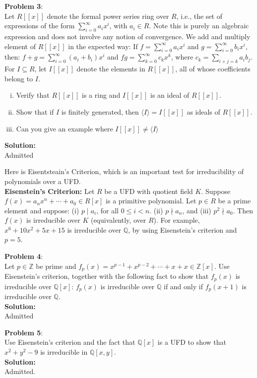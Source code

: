 \documentclass[11pt]{article}
\newcommand{\prob}[3]{\begin{flushleft}
        \textbf{Problem #1}: \\
        #2 
		\textbf{Solution:} 
		#3

\end{flushleft}}
\begin{document}
\prob{3}{
  Let $R[[x]]$ denote the formal power series ring over $R$, i.e., the set of expressions of the form $\sum_{i = 0}^{\infty}a_ix^i$, with $a_i \in R$.
  Note this is purely an algebraic expression and does not involve any notion of convergence.
  We add and multiply element of $R[[x]]$ in the expected way:
  If $f = \sum_{i=0}^{\infty}a_ix^i$ and $g = \sum_{i=0}^{\infty}b_ix^i$, then:
  $f + g = \sum_{i=0}^{\infty}(a_i + b_i)x^i$ and $fg = \sum_{k=0}^{\infty}c_kx^k$, where $c_k = \sum_{i + j = k}a_ib_j$. For $I \subseteq R$, let $I[[x]]$ denote the elements in $R[[x]]$, all of whose coefficients belong to $I$.
  \begin{enumerate}[(i)]
    \item Verify that $R[[x]]$ is a ring and $I[[x]]$ is an ideal of $R[[x]]$.
    \item Show that if $I$ is finitely generated, then $\langle I \rangle = I[[x]]$ as ideals of $R[[x]]$.
    \item Can you give an example where $I[[x]] \neq \langle I \rangle$
  \end{enumerate}
}{ \\
  Admitted
}
Here is Eisentsteain's Criterion, which is an important test for irreducibility of polynomials over a UFD. \\
\textbf{Eisenstein's Criterion:} Let $R$ be a UFD with quotient field $K$.
Suppose $f(x) = a_nx^n + \cdots + a_0 \in R[x]$ is a primitive polynomial.
Let $p \in R$ be a prime element and suppose: (i) $p \mid a_i$, for all $0 \leq i < n$.
(ii) $p \nmid a_n$, and (iii) $p^2 \nmid a_0$.
Then $f(x)$ is irreducible over $K$ (equivalently, over $R$).
For example, $x^6 + 10x^2 + 5x + 15$ is irreducible over $\mathbb{Q}$, by using Eisenstein's criterion and $p = 5$.

\prob{4}{
  Let $p \in \mathbb{Z}$ be prime and $f_p(x) = x^{p-1} + x^{p-2} + \cdots + x + x \in \mathbb{Z}[x]$. Use Eisenstein's criterion, together with the following fact to show that $f_p(x)$ is irreducible over $\mathbb{Q}[x]$: $f_p(x)$ is irreducible over $\mathbb{Q}$ if and only if $f_p(x + 1)$ is irreducible over $\mathbb{Q}$. \\
}{ \\
  Admitted
}

\prob{5}{
  Use Eisenstein's criterion and the fact that $\mathbb{Q}[x]$ is a UFD to show that $x^2 + y^2 - 9$ is irreducible in $\mathbb{Q}[x,y]$. \\
}{ \\
  Admitted.
}
\end{document}
